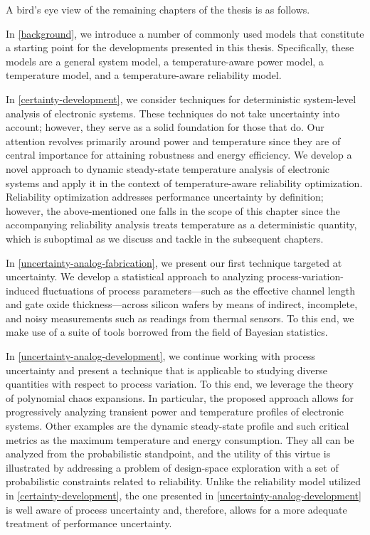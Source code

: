 A bird's eye view of the remaining chapters of the thesis is as follows.

In \cref{background}, we introduce a number of commonly used models that
constitute a starting point for the developments presented in this thesis.
Specifically, these models are a general system model, a temperature-aware power
model, a temperature model, and a temperature-aware reliability model.

In \cref{certainty-development}, we consider techniques for deterministic
system-level analysis of electronic systems. These techniques do not take
uncertainty into account; however, they serve as a solid foundation for those
that do. Our attention revolves primarily around power and temperature since
they are of central importance for attaining robustness and energy efficiency.
We develop a novel approach to dynamic steady-state temperature analysis of
electronic systems and apply it in the context of temperature-aware reliability
optimization. Reliability optimization addresses performance uncertainty by
definition; however, the above-mentioned one falls in the scope of this chapter
since the accompanying reliability analysis treats temperature as a
deterministic quantity, which is suboptimal as we discuss and tackle in the
subsequent chapters.

In \cref{uncertainty-analog-fabrication}, we present our first technique
targeted at uncertainty. We develop a statistical approach to analyzing
process-variation-induced fluctuations of process parameters---such as the
effective channel length and gate oxide thickness---across silicon wafers by
means of indirect, incomplete, and noisy measurements such as readings from
thermal sensors. To this end, we make use of a suite of tools borrowed from the
field of Bayesian statistics.

In \cref{uncertainty-analog-development}, we continue working with process
uncertainty and present a technique that is applicable to studying diverse
quantities with respect to process variation. To this end, we leverage the
theory of polynomial chaos expansions. In particular, the proposed approach
allows for progressively analyzing transient power and temperature profiles of
electronic systems. Other examples are the dynamic steady-state profile and such
critical metrics as the maximum temperature and energy consumption. They all can
be analyzed from the probabilistic standpoint, and the utility of this virtue is
illustrated by addressing a problem of design-space exploration with a set of
probabilistic constraints related to reliability. Unlike the reliability model
utilized in \cref{certainty-development}, the one presented in
\cref{uncertainty-analog-development} is well aware of process uncertainty and,
therefore, allows for a more adequate treatment of performance uncertainty.

